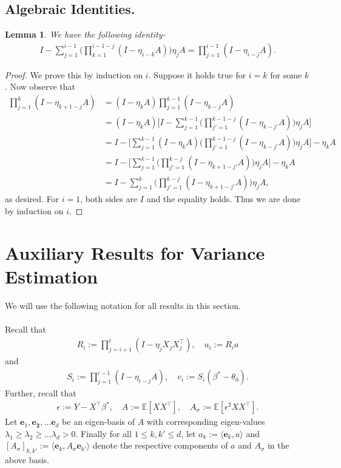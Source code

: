 \documentclass[11pt, reqno,english]{amsart}
\newtheorem{lemma}{Lemma}[section]
\begin{document}
\subsection{Algebraic Identities.}
\begin{lemma}\label{matrix-algebra-identity}
We have the following identity-
\begin{align*}
    I - \sum_{j = 1}^{i-1}\bigg(\prod_{k = 1}^{i-1-j}(I - \eta_{i-k}A)\bigg)\eta_j A = \prod_{j = 1}^{i-1}(I - \eta_{i - j}A).
\end{align*}
\end{lemma}
\begin{proof}
We prove this by induction on $i$. Suppose it holds true for $i = k$ for some $k$. Now observe that
\begin{align*}
\prod_{j = 1}^k (I - \eta_{k+1 -j}A) &= (I - \eta_k A)\prod_{j = 1}^{k-1} (I - \eta_{k - j}A)
\\
&= (I - \eta_kA) \bigg[I - \sum_{j = 1}^{k-1}\bigg(\prod_{j' = 1}^{k-1-j} (I - \eta_{k - j'}A)\bigg)\eta_jA\bigg]
\\
&= I - \bigg[\sum_{j = 1}^{k-1}(I - \eta_k A)\bigg(\prod_{j' = 1}^{k-1-j}(I - \eta_{k - j'}A)\bigg)\eta_j A \bigg] - \eta_kA
\\
&= I - \bigg[\sum_{j = 1}^{k-1}\bigg(\prod_{j' = 1}^{k-j}(I - \eta_{k+1 - j'}A)\bigg)\eta_jA\bigg] - \eta_kA
\\
&= I - \sum_{j = 1}^{k}\bigg(\prod_{j' = 1}^{k-j}(I - \eta_{k+1 - j'}A)\bigg)\eta_jA,
\end{align*}
as desired. For $i = 1$, both sides are $I$ and the equality holds. Thus we are done by induction on $i$.
\end{proof}
\section{Auxiliary Results for Variance Estimation}
We will use the following notation for all results in this section. 
\\\\
Recall that
\begin{align*}
R_i:= \prod_{j = i+1}^{t}(I - \eta_{j}X_{j}X^\top_{j}), \quad u_i := R_ia
\end{align*}
and 
\begin{align*}
S_i := \prod_{j = 1}^{i-1}(I - \eta_{i-j}A), \quad v_i := S_i(\beta^* - \theta_0).
\end{align*}
Further, recall that
\begin{align*}
\epsilon := Y - X^\top \beta^*, \quad A := \mathbb{E}[XX^\top], \quad 
A_{\sigma} := \mathbb{E}[\epsilon^2 XX^\top].
\end{align*}
Let $\mathbf{e}_1, \mathbf{e_2}, \dots \mathbf{e}_d$ be an eigen-basis of $A$ with corresponding eigen-values $\lambda_1 \geq \lambda_2 \geq \dots \lambda_d > 0$. Finally for all $1 \leq k, k' \leq d$, let $a_k := \langle \mathbf{e}_k, a \rangle$ and $[A_{\sigma}]_{k,k'} := \langle  \mathbf{e}_k, A_\sigma \mathbf{e}_{k'}\rangle$ denote the respective components of $a$ and $A_{\sigma}$ in the above basis.
\end{document}
